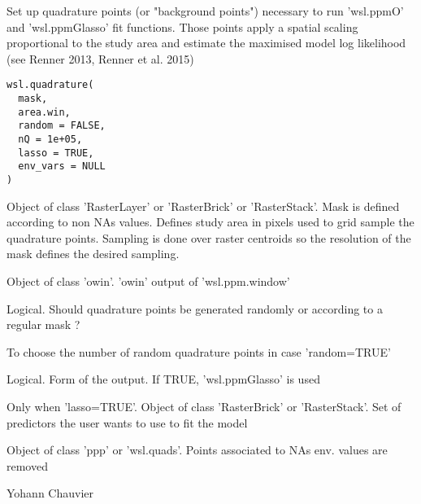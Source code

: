 \documentclass[a4paper]{book}
\begin{document}
%
\begin{Description}\relax
Set up quadrature points (or "background points") necessary to run 'wsl.ppmO' and
'wsl.ppmGlasso' fit functions. Those points apply a spatial scaling proportional to the study
area and estimate the maximised model log likelihood (see Renner 2013, Renner et al. 2015)
\end{Description}
%
\begin{Usage}
\begin{verbatim}
wsl.quadrature(
  mask,
  area.win,
  random = FALSE,
  nQ = 1e+05,
  lasso = TRUE,
  env_vars = NULL
)
\end{verbatim}
\end{Usage}
%
\begin{Arguments}
\begin{ldescription}
\item[\code{mask}] Object of class 'RasterLayer' or 'RasterBrick' or 'RasterStack'. Mask is defined
according to non NAs values. Defines study area in pixels used to grid sample the quadrature points.
Sampling is done over raster centroids so the resolution of the mask defines the desired sampling.

\item[\code{area.win}] Object of class 'owin'. 'owin' output of 'wsl.ppm.window'

\item[\code{random}] Logical. Should quadrature points be generated randomly or according
to a regular mask ?

\item[\code{nQ}] To choose the number of random quadrature points in case 'random=TRUE'

\item[\code{lasso}] Logical. Form of the output. If TRUE, 'wsl.ppmGlasso' is used

\item[\code{env\_vars}] Only when 'lasso=TRUE'. Object of class 'RasterBrick' or 'RasterStack'.
Set of predictors the user wants to use to fit the model
\end{ldescription}
\end{Arguments}
%
\begin{Value}
Object of class 'ppp' or 'wsl.quads'. Points associated to NAs env. values are removed
\end{Value}
%
\begin{Author}\relax
Yohann Chauvier
\end{Author}
\end{document}
